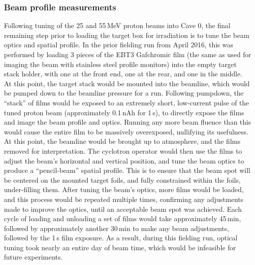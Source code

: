 




\subsubsection{Beam profile measurements}




Following  tuning of the 25 and 55\,MeV proton beams into Cave 0, the  final remaining step prior to loading the  target box for irradiation is to tune the beam optics and spatial profile.
In the prior fielding run from April 2016, this was performed by loading 3 pieces of the EBT3 Gafchromic film (the same as used for imaging the beam  with stainless steel profile monitors) into the empty target stack holder, with one at the front end, one at the rear, and one in the middle.
At this point, the target stack would be mounted into the beamline, which would be pumped down to the  beamline pressure for a run.
Following pumpdown, the \enquote{stack} of films would be exposed to an extremely short, low-current pulse of the tuned proton beam (approximately 0.1\,nAh for 1\,s), to directly expose the films and image the beam profile and optics.
Running any more beam fluence than this would cause the entire film to be massively overexposed, nullifying its usefulness.
At this point, the beamline would be brought up to atmosphere, and  the films removed for interpretation.
The cyclotron operator would then use the films to adjust the beam's horizontal and vertical position, and tune the beam optics to produce a \enquote{pencil-beam} spatial profile.
This is to ensure that the beam spot will be centered on the mounted target foils, and fully constrained within the foils, under-filling them.
After tuning the beam's optics, more films would be loaded, and this process would be repeated multiple times, confirming any adjustments made to improve the optics, until an acceptable beam spot was achieved. 
Each cycle of loading and unloading a set of films would take approximately 45\,min, followed by approximately another 30\,min to make any beam adjustments, followed by the 1\,s film exposure.
As a result, during this fielding run, optical tuning took nearly an entire day of beam time, which would be infeasible for future experiments.


